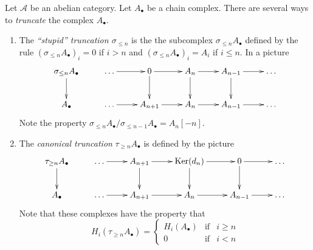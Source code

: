 \noindent
Let $\mathcal{A}$ be an abelian category.
Let $A_\bullet$ be a chain complex. There
are several ways to {\it truncate} the complex $A_\bullet$.
\begin{enumerate}
\item The {\it ``stupid'' truncation $\sigma_{\leq n}$}
is the the subcomplex $\sigma_{\leq n} A_\bullet$ defined
by the rule $(\sigma_{\leq n} A_\bullet)_i = 0$ if
$i > n$ and $(\sigma_{\leq n} A_\bullet)_i = A_i$ if
$i \leq n$. In a picture
$$
\xymatrix{
\sigma_{\leq n}A_\bullet \ar[d]  &
\ldots \ar[r] &
0 \ar[r] \ar[d] &
A_n \ar[r] \ar[d] &
A_{n - 1} \ar[r] \ar[d] &
\ldots \\
A_\bullet  &
\ldots \ar[r] &
A_{n + 1} \ar[r] &
A_n \ar[r] &
A_{n - 1} \ar[r] &
\ldots
}
$$
Note the property
$\sigma_{\leq n}A_\bullet / \sigma_{\leq n - 1}A_\bullet = A_n[-n]$.
\item The {\it canonical truncation} $\tau_{\geq n}A_\bullet$
is defined by the picture
$$
\xymatrix{
\tau_{\geq n}A_\bullet \ar[d]  &
\ldots \ar[r] &
A_{n + 1} \ar[r] \ar[d] &
\text{Ker}(d_n) \ar[r] \ar[d] &
0 \ar[r] \ar[d] &
\ldots \\
A_\bullet  &
\ldots \ar[r] &
A_{n + 1} \ar[r] &
A_n \ar[r] &
A_{n - 1} \ar[r] &
\ldots
}
$$
Note that these complexes have the property that
$$
H_i(\tau_{\geq n}A_\bullet) =
\left\{
\begin{matrix}
H_i(A_\bullet) & \text{if} & i \geq n \\
0 & \text{if} & i < n
\end{matrix}
\right.
$$
\end{enumerate}

